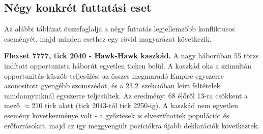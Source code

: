 ﻿\documentclass[a4paper,12pt]{report}
\begin{document}
\subsection*{Négy konkrét futtatási eset}

Az alábbi táblázat összefoglalja a négy futtatás legjellemzőbb konfliktusos eseményét,
majd minden esethez egy rövid magyarázat következik.

\begin{table}[h]
  \centering
  \small
  \caption{Konfliktusos struktúra-típusok a négy futtatásban.}
  \label{tab:neurosim-conflict-cases}
\end{table}

\textbf{Flexset 7777, tick 2040 - Hawk-Hawk kaszkád.}
A nagy háborúban 55 törzs indított opportunista háborút egyetlen ticken belül.
A kaszkád oka a szimultán opportunitás-küszöb-teljesülés: az összes megmaradó Empire
egyszerre azonosított gyengébb szomszédot, és a 23.2~szekcióban leírt feltételek
mindannyiuknál egyszerre teljesültek. Az eredmény: 68 élőről 13-ra csökkent a mező
$\approx$210 tick alatt (tick 2043-tól tick 2250-ig). A kaszkád nem egyetlen esemény
következménye volt - a győztesek is elvesztítottek populációt és erőforrásokat,
majd az így meggyengült pozíciókra újabb deklarációk következtek.
\end{document}
